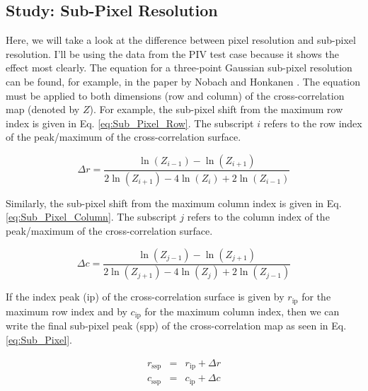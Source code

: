 \documentclass[letterpaper,12pt]{article}
\begin{document}
\subsection{Study: Sub-Pixel Resolution}
\label{subsec:Study_Sub_Pixel_Resolution}

Here, we will take a look at the difference between pixel resolution and sub-pixel resolution.  I'll be using the data from the PIV test case because it shows the effect most clearly.  The equation for a three-point Gaussian sub-pixel resolution can be found, for example, in the paper by Nobach and Honkanen \cite{2005_Nobach_EIF}.  The equation must be applied to both dimensions (row and column) of the cross-correlation map (denoted by $Z$).  For example, the sub-pixel shift from the maximum row index is given in Eq. \eqref{eq:Sub_Pixel_Row}.  The subscript $i$ refers to the row index of the peak/maximum of the cross-correlation surface.

\begin{equation}
\Delta r = \frac{\ln\left(Z_{i-1}\right)-\ln\left(Z_{i+1}\right)}{2\ln\left(Z_{i+1}\right) - 4\ln\left(Z_i\right) + 2\ln\left(Z_{i-1}\right)}
\label{eq:Sub_Pixel_Row}
\end{equation}

\noindent Similarly, the sub-pixel shift from the maximum column index is given in Eq. \eqref{eq:Sub_Pixel_Column}.  The subscript $j$ refers to the column index of the peak/maximum of the cross-correlation surface.

\begin{equation}
\Delta c = \frac{\ln\left(Z_{j-1}\right)-\ln\left(Z_{j+1}\right)}{2\ln\left(Z_{j+1}\right) - 4\ln\left(Z_j\right) + 2\ln\left(Z_{j-1}\right)}
\label{eq:Sub_Pixel_Column}
\end{equation}

\noindent If the index peak (ip) of the cross-correlation surface is given by $r_\text{ip}$ for the maximum row index and by $c_\text{ip}$ for the maximum column index, then we can write the final sub-pixel peak (spp) of the cross-correlation map as seen in Eq. \eqref{eq:Sub_Pixel}.

\begin{equation}
\begin{aligned}
r_\text{ssp} &=& r_\text{ip} + \Delta r \\
c_\text{ssp} &=& c_\text{ip} + \Delta c
\end{aligned}
\label{eq:Sub_Pixel}
\end{equation}
\end{document}
